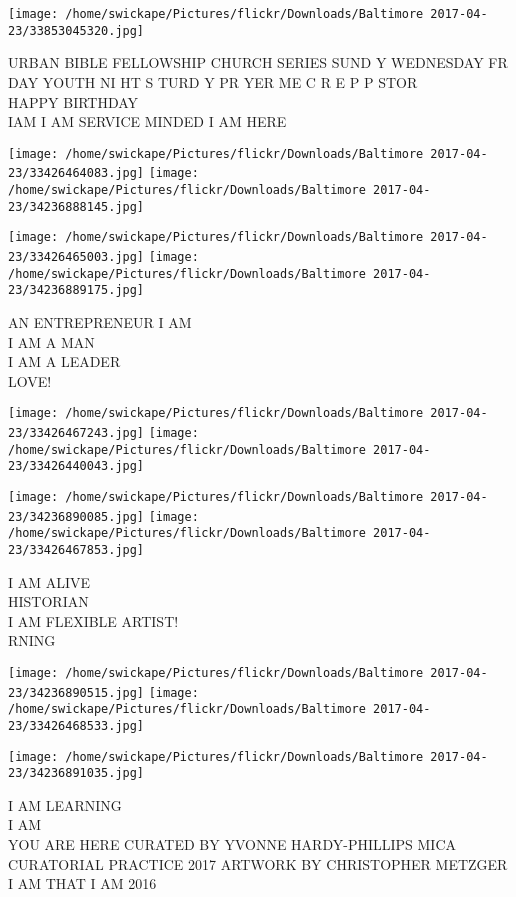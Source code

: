 \documentclass[10pt,letterpaper]{article}
\begin{document}
\vspace{0.25in}
\texttt{[image: /home/swickape/Pictures/flickr/Downloads/Baltimore 2017-04-23/33853045320.jpg]}

URBAN BIBLE FELLOWSHIP CHURCH SERIES SUND Y WEDNESDAY FR DAY YOUTH NI HT S TURD Y PR YER ME C R E P P STOR\\
HAPPY BIRTHDAY\\
IAM I AM SERVICE MINDED I AM HERE\\
\pagebreak

\texttt{[image: /home/swickape/Pictures/flickr/Downloads/Baltimore 2017-04-23/33426464083.jpg]}
\texttt{[image: /home/swickape/Pictures/flickr/Downloads/Baltimore 2017-04-23/34236888145.jpg]}

\texttt{[image: /home/swickape/Pictures/flickr/Downloads/Baltimore 2017-04-23/33426465003.jpg]}
\texttt{[image: /home/swickape/Pictures/flickr/Downloads/Baltimore 2017-04-23/34236889175.jpg]}

AN ENTREPRENEUR I AM\\
I AM A MAN\\
I AM A LEADER\\
LOVE!\\
\pagebreak

\texttt{[image: /home/swickape/Pictures/flickr/Downloads/Baltimore 2017-04-23/33426467243.jpg]}
\texttt{[image: /home/swickape/Pictures/flickr/Downloads/Baltimore 2017-04-23/33426440043.jpg]}

\texttt{[image: /home/swickape/Pictures/flickr/Downloads/Baltimore 2017-04-23/34236890085.jpg]}
\texttt{[image: /home/swickape/Pictures/flickr/Downloads/Baltimore 2017-04-23/33426467853.jpg]}

I AM ALIVE\\
HISTORIAN\\
I AM FLEXIBLE ARTIST!\\
RNING\\
\pagebreak

\texttt{[image: /home/swickape/Pictures/flickr/Downloads/Baltimore 2017-04-23/34236890515.jpg]}
\texttt{[image: /home/swickape/Pictures/flickr/Downloads/Baltimore 2017-04-23/33426468533.jpg]}

\texttt{[image: /home/swickape/Pictures/flickr/Downloads/Baltimore 2017-04-23/34236891035.jpg]}

I AM LEARNING\\
I AM\\
YOU ARE HERE CURATED BY YVONNE HARDY{-}PHILLIPS MICA CURATORIAL PRACTICE 2017 ARTWORK BY CHRISTOPHER METZGER I AM THAT I AM 2016\\
\pagebreak
\end{document}
